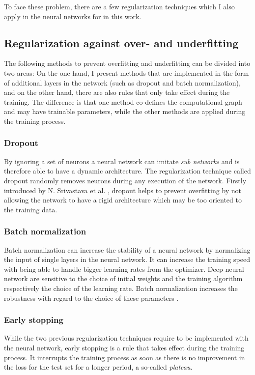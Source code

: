 To face these problem, there are a few regularization techniques which I also apply in the neural networks for in this work.

\subsection{Regularization against over- and underfitting}
The following methods to prevent overfitting and underfitting can be divided into two areas: On the one hand, I present methods that are implemented in the form of additional layers in the network (such as dropout and batch normalization), and on the other hand, there are also rules that only take effect during the training. The difference is that one method co-defines the computational graph and may have trainable parameters, while the other methods are applied during the training process.

\subsubsection{Dropout}
By ignoring a set of neurons a neural network can imitate \textit{sub networks} and is therefore able to have a dynamic architecture. The regularization technique called dropout randomly removes neurons during any execution of the network. Firstly introduced by N. Srivastava et al. \cite{srivastava_dropout_2014}, dropout helps to prevent overfitting by not allowing the network to have a rigid architecture which may be too oriented to the training data.

\subsubsection{Batch normalization}
Batch normalization can increase the stability of a neural network by normalizing the input of single layers in the neural network. It can increase the training speed with being able to handle bigger learning rates from the optimizer. Deep neural network are sensitive to the choice of initial weights and the training algorithm respectively the choice of the learning rate. Batch normalization increases the robustness with regard to the choice of these parameters \cite{ioffe_batch_2015}.

\subsubsection{Early stopping}
While the two previous regularization techniques require to be implemented with the neural network, early stopping  is a rule that takes effect during the training process. It interrupts the training process as soon as there is no improvement in the loss for the test set for a longer period, a so-called \textit{plateau}.\\


